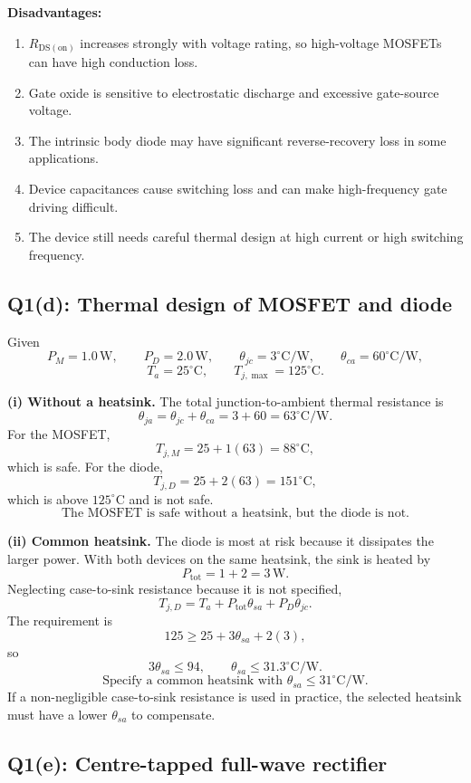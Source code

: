 \documentclass[11pt,a4paper]{article}
\newcommand{\unit}[1]{\,\mathrm{#1}}
\newcommand{\answerbox}[1]{\[\boxed{#1}\]}
\begin{document}
\textbf{Disadvantages:}
\begin{enumerate}
\item $R_{\mathrm{DS(on)}}$ increases strongly with voltage rating, so high-voltage MOSFETs can have high conduction loss.
\item Gate oxide is sensitive to electrostatic discharge and excessive gate-source voltage.
\item The intrinsic body diode may have significant reverse-recovery loss in some applications.
\item Device capacitances cause switching loss and can make high-frequency gate driving difficult.
\item The device still needs careful thermal design at high current or high switching frequency.
\end{enumerate}

\subsection*{Q1(d): Thermal design of MOSFET and diode}

Given
\[
P_M=1.0\unit{W},\qquad P_D=2.0\unit{W},\qquad
\theta_{jc}=3^\circ\mathrm{C/W},\qquad \theta_{ca}=60^\circ\mathrm{C/W},
\]
\[
T_a=25^\circ\mathrm{C},\qquad T_{j,\max}=125^\circ\mathrm{C}.
\]

\textbf{(i) Without a heatsink.} The total junction-to-ambient thermal resistance is
\[
\theta_{ja}=\theta_{jc}+\theta_{ca}=3+60=63^\circ\mathrm{C/W}.
\]
For the MOSFET,
\[
T_{j,M}=25+1(63)=88^\circ\mathrm{C},
\]
which is safe. For the diode,
\[
T_{j,D}=25+2(63)=151^\circ\mathrm{C},
\]
which is above $125^\circ\mathrm{C}$ and is not safe.
\answerbox{\text{The MOSFET is safe without a heatsink, but the diode is not.}}

\textbf{(ii) Common heatsink.} The diode is most at risk because it dissipates the larger power. With both devices on the same heatsink, the sink is heated by
\[
P_{\mathrm{tot}}=1+2=3\unit{W}.
\]
Neglecting case-to-sink resistance because it is not specified,
\[
T_{j,D}=T_a+P_{\mathrm{tot}}\theta_{sa}+P_D\theta_{jc}.
\]
The requirement is
\[
125\ge 25+3\theta_{sa}+2(3),
\]
so
\[
3\theta_{sa}\le 94,
\qquad
\theta_{sa}\le 31.3^\circ\mathrm{C/W}.
\]
\answerbox{\text{Specify a common heatsink with }\theta_{sa}\le 31^\circ\mathrm{C/W}.}
If a non-negligible case-to-sink resistance is used in practice, the selected heatsink must have a lower $\theta_{sa}$ to compensate.

\subsection*{Q1(e): Centre-tapped full-wave rectifier}
\end{document}
